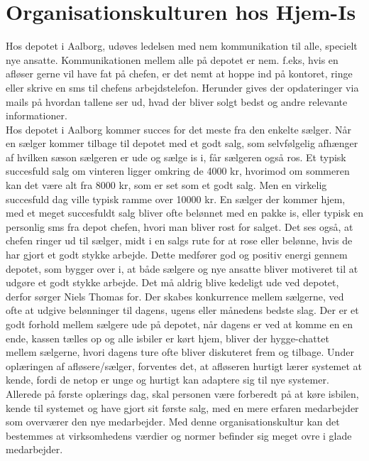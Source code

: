 \section{Organisationskulturen hos Hjem-Is}
Hos depotet i Aalborg, udøves ledelsen med nem kommunikation til alle, specielt nye ansatte. Kommunikationen mellem alle på depotet er nem. f.eks, hvis en afløser gerne vil have fat på chefen, er det nemt at hoppe ind på kontoret, ringe eller skrive en sms til chefens arbejdstelefon. Herunder gives der opdateringer via mails på hvordan tallene ser ud, hvad der bliver solgt bedst og andre relevante informationer. \\
Hos depotet i Aalborg kommer succes for det meste fra den enkelte sælger. Når en sælger kommer tilbage til depotet med et godt salg, som selvfølgelig afhænger af hvilken sæson sælgeren er ude og sælge is i, får sælgeren også ros. Et typisk succesfuld salg om vinteren ligger omkring de 4000 kr, hvorimod om sommeren kan det være alt fra 8000 kr, som er set som et godt salg. Men en virkelig succesfuld dag ville typisk ramme over 10000 kr. En sælger der kommer hjem, med et meget succesfuldt salg bliver ofte belønnet med en pakke is, eller typisk en personlig sms fra depot chefen, hvori man bliver rost for salget. Det ses også, at chefen ringer ud til sælger, midt i en salgs rute for at rose eller belønne, hvis de har gjort et godt stykke arbejde. Dette medfører god og positiv energi gennem depotet, som bygger over i, at både sælgere og nye ansatte bliver motiveret til at udgøre et godt stykke arbejde. Det må aldrig blive kedeligt ude ved depotet, derfor sørger Niels Thomas for. Der skabes konkurrence mellem sælgerne, ved ofte at udgive belønninger til dagens, ugens eller månedens bedste slag. Der er et godt forhold mellem sælgere ude på depotet, når dagens er ved at komme en en ende, kassen tælles op og alle isbiler er kørt hjem, bliver der hygge-chattet mellem sælgerne, hvori dagens ture ofte bliver diskuteret frem og tilbage. Under oplæringen af afløsere/sælger, forventes det, at afløseren hurtigt lærer systemet at kende, fordi de netop er unge og hurtigt kan adaptere sig til nye systemer. Allerede på første oplærings dag, skal personen være forberedt på at køre isbilen, kende til systemet og have gjort sit første salg, med en mere erfaren medarbejder som overværer den nye medarbejder. Med denne organisationskultur kan det bestemmes at virksomhedens værdier og normer befinder sig meget ovre i glade medarbejder. 

